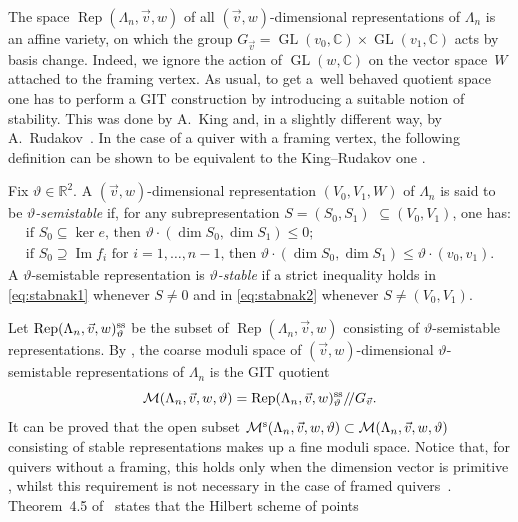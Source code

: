 \documentclass[pdftex]{sigma}
\numberwithin{equation}{section}
\begin{document}
The space $\operatorname{Rep}(\Lambda_n ,\vec{v},w)$ of all $(\vec{v},w)$-dimensional representations of $\Lambda_n$
is an affine variety, on which the group $G_{\vec{v}}=\operatorname{GL}(v_0,\mathbb{C})\times\operatorname{GL}(v_1,\mathbb{C})$ acts by basis change. Indeed, we ignore the action of $\operatorname{GL}(w,\mathbb{C})$ on the vector space~$W$ attached to the framing vertex. As usual, to get a~well behaved quotient space one has to perform a GIT construction by introducing a suitable notion of stability. This was done by A.~King \cite{KiQ} and, in a slightly different way, by A.~Rudakov~\cite{Rud97}. In the case of a quiver with a framing vertex, the following definition can be shown to be equivalent to the King--Rudakov one \cite{blr, CrBo}.
\begin{Definition}\label{def:stabil}
 Fix $\vartheta\in\mathbb R^2$. A $(\vec{v},w)$-dimensional representation {$(V_0,V_1,W)$} of $\Lambda_n$ is said to be \emph{$\vartheta$-semistable} if, for any subrepresentation $S=(S_0,S_1)$ {$\subseteq (V_0,V_1)$}, one has:
\begin{gather}
 \text{if $S_0\subseteq \ker e$, then $\vartheta\cdot(\dim S_0,\dim S_1)\leq0$} ;\label{eq:stabnak1}\\[5pt]
 \text{if $S_0\supseteq \operatorname{Im} f_i$ for $i=1,\dots,n-1$, then $\vartheta\cdot(\dim S_0,\dim S_1)\leq\vartheta\cdot(v_0,v_1)$} .\label{eq:stabnak2}
\end{gather}
A $\vartheta$-semistable representation is \emph{$\vartheta$-stable} if a strict inequality holds in \eqref{eq:stabnak1} whenever $S\neq0$ and
in \eqref{eq:stabnak2} whenever $S\neq(V_0,V_1)$.
\end{Definition}
Let $\operatorname{Rep}(\Lambda_n, \vec{v}, w)^{\rm ss}_\vartheta$ be the subset of $\operatorname{Rep}(\Lambda_n,\vec{v},w)$ consisting of $\vartheta$-semistable representations. By \cite[Proposition 5.2]{KiQ}, the coarse moduli space of
$(\vec{v},w)$-dimensional $\vartheta$-semistable representations of $\Lambda_n$ is the GIT quotient
\[\mathcal{M} (\Lambda_n,\vec{v},w, \vartheta)=\operatorname{Rep}(\Lambda_n, \vec{v}, w)^{\rm ss}_\vartheta/\!/ G_{\vec{v}} .\]
It can be proved that the open subset $\mathcal{M}^{\rm s} (\Lambda_n,\vec{v},w, \vartheta) \subset \mathcal{M} (\Lambda_n,\vec{v},w, \vartheta)$
consisting of stable representations makes up a fine moduli space. Notice that, for quivers without a framing, this
holds only when the dimension vector is primitive \cite[Proposition~5.3]{KiQ}, whilst this requirement is not necessary in the case of framed quivers~\cite{CrBo}. Theorem~4.5 of~\cite{bblr} states that the Hilbert scheme of points
\end{document}
